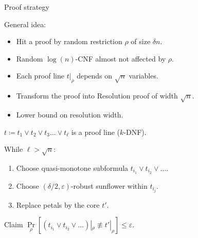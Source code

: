 \begin{frame}{Proof strategy}

    General idea:
    \begin{itemize}
        \item Hit a proof by random restriction $\rho$ of size $\delta n$.
            \pause
        \item Random $\log(n)$-CNF \alert{almost} not affected by $\rho$.
            \pause
        \item Each proof line $t|_{\rho}$ depends on $\sqrt{n}$ variables. 
            \pause
        \item Transform the proof into Resolution proof of width $\sqrt{n}$.
            \pause
        \item Lower bound on resolution width.
    \end{itemize}

    \pause
    \vspace{0.5cm}

    $t \coloneqq t_1 \lor t_2 \lor t_3 \dots \lor t_{\ell}$ is a proof line ($k$-DNF).

    \pause
    \vspace{0.3cm}
    While $\ell > \sqrt{n}$:
    \begin{enumerate}
        \item Choose \alert{quasi}-monotone subformula $t_{i_1} \lor t_{i_2} \lor \dots$.
        \item Choose $(\delta / 2, \varepsilon)$-robust sunflower within $t_{i_j}$.
        \item Replace petals by the core $t'$.
    \end{enumerate}

    \begin{block}{Claim}
        $\Pr\limits_{\rho}[(t_{i_1} \lor t_{i_2} \lor \dots)|_{\rho} \not\equiv t'|_{\rho}] \le \varepsilon$. 
    \end{block}
\end{frame}


